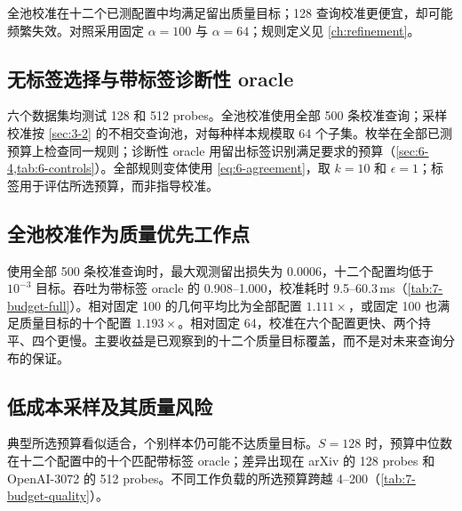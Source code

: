 全池校准在十二个已测配置中均满足留出质量目标；128 查询校准更便宜，却可能频繁失效。对照采用固定 $\alpha=100$ 与 $\alpha=64$；规则定义见 \cref{ch:refinement}。

\subsection{无标签选择与带标签诊断性 oracle}

六个数据集均测试 128 和 512 probes。全池校准使用全部 500 条校准查询；采样校准按 \cref{sec:3-2} 的不相交查询池，对每种样本规模取 64 个子集。枚举在全部已测预算上检查同一规则；诊断性 oracle 用留出标签识别满足要求的预算（\cref{sec:6-4,tab:6-controls}）。全部规则变体使用 \cref{eq:6-agreement}，取 $k=10$ 和 $\epsilon=1$；标签用于评估所选预算，而非指导校准。

\subsection{全池校准作为质量优先工作点}

使用全部 500 条校准查询时，最大观测留出损失为 0.0006，十二个配置均低于 $10^{-3}$ 目标。吞吐为带标签 oracle 的 0.908--1.000，校准耗时 9.5--60.3\,ms（\cref{tab:7-budget-full}）。相对固定 100 的几何平均比为全部配置 $1.111\times$，或固定 100 也满足质量目标的十个配置 $1.193\times$。相对固定 64，校准在六个配置更快、两个持平、四个更慢。主要收益是已观察到的十二个质量目标覆盖，而不是对未来查询分布的保证。

\begin{table}[!htbp]
\centering
\caption[全池预算校准]{全池校准（$S=500$）。损失相对最佳实测留出召回率；速率为所选固定臂的 kQPS。“Cal.”是每单元一次全池校准调用，不是重复查询流计时。留出查询为 500 个，Stella 为 499 个。}
\label{tab:7-budget-full}
\footnotesize\setlength{\tabcolsep}{3pt}

\end{table}

\subsection{低成本采样及其质量风险}

典型所选预算看似适合，个别样本仍可能不达质量目标。$S=128$ 时，预算中位数在十二个配置中的十个匹配带标签 oracle；差异出现在 arXiv 的 128 probes 和 OpenAI-3072 的 512 probes。不同工作负载的所选预算跨越 4--200（\cref{tab:7-budget-quality}）。

\begin{table}[!htbp]
\centering
\caption[抽样预算的留出质量]{$S=128$ 下的留出质量。规则 $\alpha$ 为 64 次抽样中位数；oracle $\alpha$ 使用留出标签。$\overline R_{\rm rule}$ 为重建的平均召回。“Losses”计数相对最佳已测留出召回损失 $>10^{-3}$ 的抽样次数；$L_{95}$ 为日志中的较低次序 95 分位损失估计。$R_{100}$ 为固定预算召回。}
\label{tab:7-budget-quality}
\small\setlength{\tabcolsep}{3pt}

\end{table}

